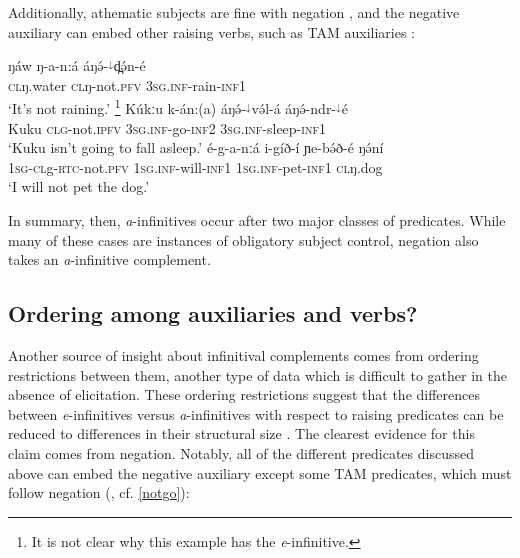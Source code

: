 Additionally, athematic subjects are fine with negation , and the negative auxiliary can embed other raising verbs, such as TAM auxiliaries :

\ea \gll ŋáw ŋ-a-n:á  áŋə́-$^{↓}$d̪ə́n-é\\
\textsc{cl}ŋ.water \textsc{cl}ŋ-not.\textsc{pfv}   \textsc{3sg.inf}-rain-\textsc{inf1}\\
\glt ‘It's not raining.’ \label{ex:ch15:raining} \footnote{It is not clear why this example has the \textit{e}-infinitive.}
\ex  \ea  \gll  Kúkːu k-án:(a) áŋə́-$^{↓}$və́l-á áŋə́-ndr-$^{↓}$é\\
Kuku \textsc{clg}-not.\textsc{ipfv} \textsc{3sg.inf}-go-\textsc{inf2} \textsc{3sg.inf}-sleep-\textsc{inf1}\\
\glt `Kuku isn't going to fall asleep.'  \label{notgo}
\ex  \gll    é-g-a-nːá i-gíð-í ɲe-bə́ð-é ŋə́ní		\\
\textsc{1sg}-\textsc{cl}g-\textsc{rtc}-not.\textsc{pfv} \textsc{1sg.inf}-will-\textsc{inf1} \textsc{1sg.inf}-pet-\textsc{inf1} \textsc{cl}ŋ.dog\\
\glt ‘I will not pet the dog.’	\label{ex:ch15:dog}
\z 

In summary, then, \textit{a}-infinitives occur after two major classes of predicates. While many of these cases are instances of obligatory subject control, negation also takes an \textit{a}-infinitive complement.



\subsection{Ordering among auxiliaries and verbs?}

Another source of insight about infinitival complements comes from ordering restrictions between them, another type of data which is difficult to gather in the absence of elicitation. These ordering restrictions suggest that the differences between \textit{e}-infinitives versus \textit{a}-infinitives with respect to raising predicates can be reduced to differences in their structural size \citep[cf.][]{wurm03}. The clearest evidence for this claim comes from negation. Notably, all of the different predicates discussed above can embed the negative auxiliary except some TAM predicates, which must follow negation (, cf. \ref{notgo}):

 \label{ex:ch15:asleep}
\z 


